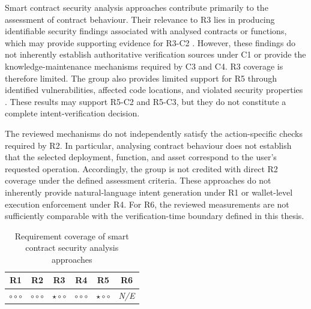 Smart contract security analysis approaches contribute
primarily to the assessment of contract behaviour.
Their relevance to R3 lies in producing identifiable
security findings associated with analysed contracts
or functions, which may provide supporting evidence
for R3-C2
\cite{sunGPTScanDetectingLogic2023,
TODO_PropertyGPT}. However, these findings do not
inherently establish authoritative verification sources
under C1 or provide the knowledge-maintenance mechanisms
required by C3 and C4. R3 coverage is therefore limited. The group also provides limited support for R5 through
identified vulnerabilities, affected code locations,
and violated security properties
\cite{sunGPTScanDetectingLogic2023,
gaoLogicScanLLMDriven2026}. These results may support
R5-C2 and R5-C3, but they do not constitute a complete
intent-verification decision.

The reviewed mechanisms do not independently satisfy
the action-specific checks required by R2. In particular,
analysing contract behaviour does not establish that
the selected deployment, function, and asset correspond
to the user's requested operation. Accordingly, the
group is not credited with direct R2 coverage under
the defined assessment criteria. These approaches do not inherently provide natural-language
intent generation under R1 or wallet-level execution
enforcement under R4. For R6, the reviewed measurements
are not sufficiently comparable with the verification-time
boundary defined in this thesis.

\begin{table}[H]
\centering
\renewcommand{\arraystretch}{1.3}
\begin{tabular}{cccccc}
\hline
\textbf{R1} & \textbf{R2} & \textbf{R3} &
\textbf{R4} & \textbf{R5} & \textbf{R6} \\
\hline

$\circ\circ\circ$ &
$\circ\circ\circ$ &
$\star\circ\circ$ &
$\circ\circ\circ$ &
$\star\circ\circ$ &
\textit{N/E} \\

\hline
\end{tabular}
\caption{Requirement coverage of smart contract
security analysis approaches}
\label{tab:req_smart_contract_security}
\end{table}






